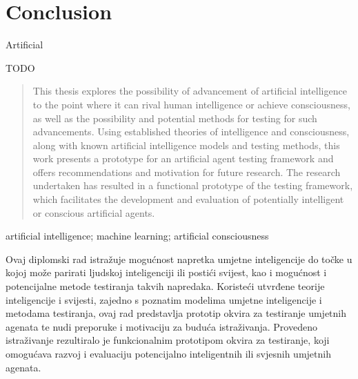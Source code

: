 \documentclass[masterthesis]{fer}
\begin{document}
\chapter{Conclusion}
\label{chp:conclusion}

Artificial

TODO








\begin{abstract}
  This thesis explores the possibility of advancement of artificial intelligence to the point where it can rival human intelligence or achieve consciousness, as well as the possibility and potential methods for testing for such advancements.
Using established theories of intelligence and consciousness, along with known artificial intelligence models and testing methods, this work presents a prototype for an artificial agent testing framework and offers recommendations and motivation for future research.
The research undertaken has resulted in a functional prototype of the testing framework, which facilitates the development and evaluation of potentially intelligent or conscious artificial agents.

\end{abstract}

\begin{keywords}
  artificial intelligence; machine learning; artificial consciousness
\end{keywords}


\begin{sazetak}
  Ovaj diplomski rad istražuje mogućnost napretka umjetne inteligencije do točke u kojoj može parirati ljudskoj inteligenciji ili postići svijest, kao i mogućnost i potencijalne metode testiranja takvih napredaka. Koristeći utvrđene teorije inteligencije i svijesti, zajedno s poznatim modelima umjetne inteligencije i metodama testiranja, ovaj rad predstavlja prototip okvira za testiranje umjetnih agenata te nudi preporuke i motivaciju za buduća istraživanja. Provedeno istraživanje rezultiralo je funkcionalnim prototipom okvira za testiranje, koji omogućava razvoj i evaluaciju potencijalno inteligentnih ili svjesnih umjetnih agenata.
\end{sazetak}
\end{document}
